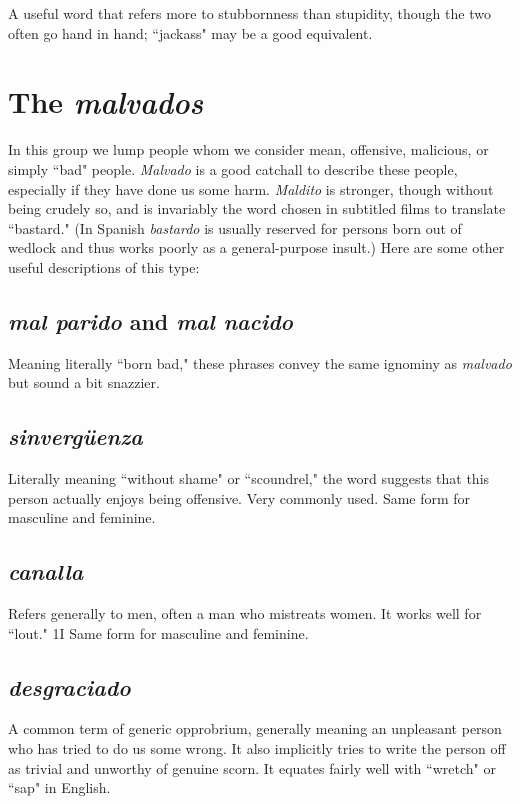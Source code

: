 A useful word that refers more to stubbornness than
stupidity, though the two often go hand in hand; ``jackass" may be a
good equivalent.

\section{The \emph{malvados}}

In this group we lump people whom we consider mean, offensive, malicious, or simply ``bad" people. \emph{Malvado} is a good catchall to
describe these people, especially if they have done us some harm. \emph{Maldito} is stronger, though without being crudely so, and is invariably the
word chosen in subtitled films to translate ``bastard." (In Spanish \emph{bastardo} is usually reserved for persons born out of wedlock and thus
works poorly as a general-purpose insult.) Here are some other useful
descriptions of this type:

\subsection{\emph{mal parido} and \emph{mal nacido}}

Meaning literally ``born bad,"
these phrases convey the same ignominy as \emph{malvado} but sound a bit
snazzier.

\subsection{\emph{sinvergüenza}}

Literally meaning ``without shame" or
``scoundrel," the word suggests that this person actually enjoys being
offensive. Very commonly used. Same form for masculine and feminine.

\subsection{\emph{canalla}}

Refers generally to men, often a man who mistreats women. It works well for ``lout." 1I Same form for masculine and
feminine.

\subsection{\emph{desgraciado}}

A common term of generic opprobrium, generally meaning an unpleasant person who has tried to do us some
wrong. It also implicitly tries to write the person off as trivial and unworthy of genuine scorn. It equates fairly well with ``wretch" or ``sap"
in English.


